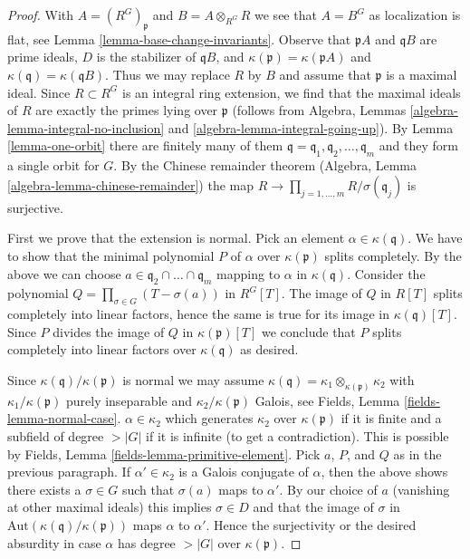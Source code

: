 \begin{proof}
With $A = (R^G)_\mathfrak p$ and $B = A \otimes_{R^G} R$ we see that $A = B^G$
as localization is flat, see Lemma \ref{lemma-base-change-invariants}.
Observe that $\mathfrak pA$ and $\mathfrak qB$ are prime ideals,
$D$ is the stabilizer of $\mathfrak qB$, and
$\kappa(\mathfrak p) = \kappa(\mathfrak pA)$ and
$\kappa(\mathfrak q) = \kappa(\mathfrak qB)$. Thus we may replace
$R$ by $B$ and assume that $\mathfrak p$ is a maximal ideal.
Since $R \subset R^G$ is an integral ring extension, we find
that the maximal ideals of $R$ are exactly the primes lying over
$\mathfrak p$ (follows from
Algebra, Lemmas \ref{algebra-lemma-integral-no-inclusion} and
\ref{algebra-lemma-integral-going-up}).
By Lemma \ref{lemma-one-orbit} there are finitely many of them
$\mathfrak q = \mathfrak q_1, \mathfrak q_2, \ldots, \mathfrak q_m$
and they form a single orbit for $G$.
By the Chinese remainder theorem
(Algebra, Lemma \ref{algebra-lemma-chinese-remainder}) the map
$R \to \prod_{j = 1, \ldots, m} R/\sigma(\mathfrak q_j)$ is surjective.

\medskip\noindent
First we prove that the extension is normal. Pick an element
$\alpha \in \kappa(\mathfrak q)$. We have to show that the
minimal polynomial $P$ of $\alpha$ over $\kappa(\mathfrak p)$
splits completely. By the above we can choose
$a \in \mathfrak q_2 \cap \ldots \cap \mathfrak q_m$
mapping to $\alpha$ in $\kappa(\mathfrak q)$.
Consider the polynomial $Q = \prod_{\sigma \in G} (T - \sigma(a))$
in $R^G[T]$. The image of $Q$ in $R[T]$ splits completely
into linear factors, hence the same is true for its
image in $\kappa(\mathfrak q)[T]$. Since $P$ divides
the image of $Q$ in $\kappa(\mathfrak p)[T]$ we conclude
that $P$ splits completely into linear factors over
$\kappa(\mathfrak q)$ as desired.

\medskip\noindent
Since $\kappa(\mathfrak q)/\kappa(\mathfrak p)$ is normal we may assume
$\kappa(\mathfrak q) = \kappa_1 \otimes_{\kappa(\mathfrak p)} \kappa_2$
with $\kappa_1/\kappa(\mathfrak p)$ purely inseparable and
$\kappa_2/\kappa(\mathfrak p)$ Galois, see
Fields, Lemma \ref{fields-lemma-normal-case}.
$\alpha \in \kappa_2$ which generates $\kappa_2$ over $\kappa(\mathfrak p)$
if it is finite and a subfield of degree $> |G|$ if it is infinite
(to get a contradiction).
This is possible by Fields, Lemma \ref{fields-lemma-primitive-element}.
Pick $a$, $P$, and $Q$ as in the previous paragraph.
If $\alpha' \in \kappa_2$
is a Galois conjugate of $\alpha$, then the above shows there exists a
$\sigma \in G$ such that $\sigma(a)$ maps to $\alpha'$. By our choice of
$a$ (vanishing at other maximal ideals) this implies $\sigma \in D$ and
that the image of $\sigma$ in
$\text{Aut}(\kappa(\mathfrak q)/\kappa(\mathfrak p))$
maps $\alpha$ to $\alpha'$. Hence the surjectivity or the
desired absurdity
in case $\alpha$ has degree $> |G|$ over $\kappa(\mathfrak p)$.
\end{proof}

